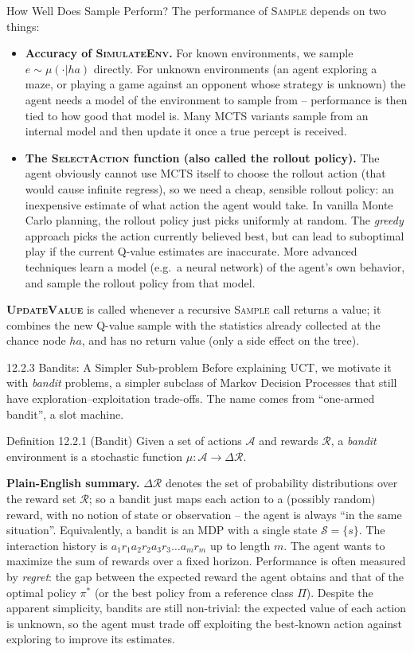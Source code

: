 \documentclass[aspectratio=169,10pt]{beamer}
\newcommand{\Acal}{\mathcal{A}}
\newcommand{\Rcal}{\mathcal{R}}
\newcommand{\Scal}{\mathcal{S}}
\begin{document}
\begin{frame}{How Well Does Sample Perform?}
The performance of \textsc{Sample} depends on two things:
\begin{itemize}
\item \textbf{Accuracy of \textsc{SimulateEnv}.} For known environments, we sample
$e\sim\mu(\cdot|ha)$ directly. For unknown environments (an agent exploring a maze, or
playing a game against an opponent whose strategy is unknown) the agent needs a model of
the environment to sample from -- performance is then tied to how good that model is. Many
MCTS variants sample from an internal model and then update it once a true percept is
received.
\item \textbf{The \textsc{SelectAction} function (also called the rollout policy).} The
agent obviously cannot use MCTS itself to choose the rollout action (that would cause
infinite regress), so we need a cheap, sensible rollout policy: an inexpensive estimate of
what action the agent would take. In vanilla Monte Carlo planning, the rollout policy just
picks uniformly at random. The \emph{greedy} approach picks the action currently believed
best, but can lead to suboptimal play if the current Q-value estimates are inaccurate.
More advanced techniques learn a model (e.g.\ a neural network) of the agent's own
behavior, and sample the rollout policy from that model.
\end{itemize}
\textbf{\textsc{UpdateValue}} is called whenever a recursive \textsc{Sample} call returns
a value; it combines the new Q-value sample with the statistics already collected at the
chance node $ha$, and has no return value (only a side effect on the tree).
\end{frame}

\begin{frame}{12.2.3 Bandits: A Simpler Sub-problem}
Before explaining UCT, we motivate it with \emph{bandit} problems, a simpler subclass of
Markov Decision Processes that still have exploration--exploitation trade-offs. The name
comes from ``one-armed bandit'', a slot machine.
\begin{block}{Definition 12.2.1 (Bandit)}
Given a set of actions $\Acal$ and rewards $\Rcal$, a \emph{bandit} environment is a
stochastic function $\mu:\Acal\to\Delta\Rcal$.
\end{block}
\textbf{Plain-English summary.} $\Delta\Rcal$ denotes the set of probability
distributions over the reward set $\Rcal$; so a bandit just maps each action to a
(possibly random) reward, with no notion of state or observation -- the agent is always
``in the same situation''. Equivalently, a bandit is an MDP with a single state
$\Scal=\{s\}$. The interaction history is $a_1r_1a_2r_2a_3r_3\ldots a_mr_m$ up to length
$m$. The agent wants to maximize the sum of rewards over a fixed horizon. Performance is
often measured by \emph{regret}: the gap between the expected reward the agent obtains and
that of the optimal policy $\pi^*$ (or the best policy from a reference class $\Pi$).
Despite the apparent simplicity, bandits are still non-trivial: the expected value of
each action is unknown, so the agent must trade off exploiting the best-known action
against exploring to improve its estimates.
\end{frame}
\end{document}
